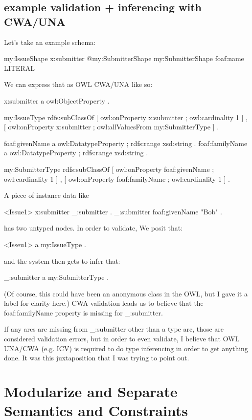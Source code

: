 \documentclass{llncs}
\begin{document}
\subsection{example validation + inferencing with CWA/UNA}

\begin{ex}
Let's take an example schema:

  my:IssueShape {
    x:submitter @my:SubmitterShape
  }
  my:SubmitterShape {
    foaf:name LITERAL
  }

We can express that as OWL CWA/UNA like so:

  x:submitter a owl:ObjectProperty .
 
  my:IssueType
    rdfs:subClassOf
      [ owl:onProperty x:submitter ;
        owl:cardinality 1 ] ,
      [ owl:onProperty x:submitter ;
        owl:allValuesFrom my:SubmitterType ] .
 
  foaf:givenName a owl:DatatypeProperty ;
    rdfs:range xsd:string .
  foaf:familyName a owl:DatatypeProperty ;
    rdfs:range xsd:string .
 
  my:SubmitterType
    rdfs:subClassOf
      [ owl:onProperty foaf:givenName ;
        owl:cardinality 1 ] ,
      [ owl:onProperty foaf:familyName ;
        owl:cardinality 1 ] .

A piece of instance data like

  <Issue1> x:submitter _:submitter .
  _:submitter foaf:givenName "Bob" .

has two untyped nodes. In order to validate, We posit that:

  <Isseu1> a my:IssueType .

and the system then gets to infer that:

  _:submitter a my:SubmitterType .

(Of course, this could have been an anonymous class in the OWL, but I
gave it a label for clarity here.) CWA validation leads us to believe
that the foaf:familyName property is missing for _:submitter.

If any arcs are missing from _:submitter other than a type arc, those
are considered validation errors, but in order to even validate, I
believe that OWL UNA/CWA (e.g. ICV) is required to do type inferencing
in order to get anything done. It was this juxtaposition that I was
trying to point out.
\end{ex}

\section{Modularize and Separate Semantics and Constraints}
\end{document}
